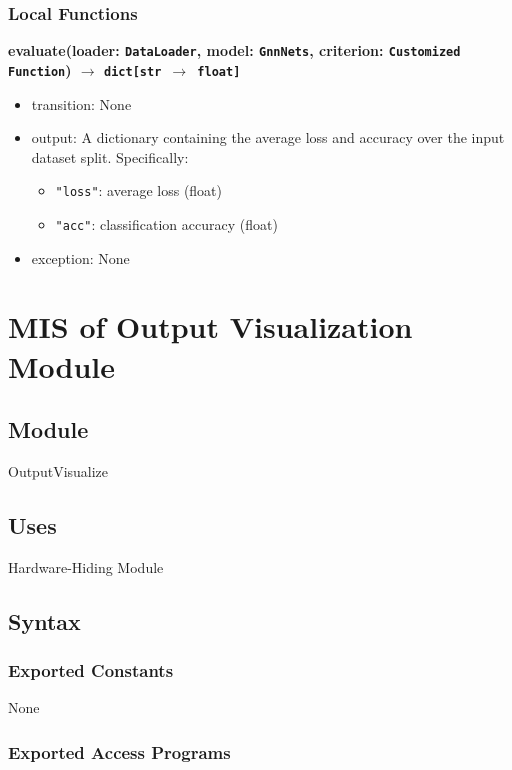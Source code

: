 \documentclass[12pt, titlepage]{article}
\begin{document}
\subsubsection{Local Functions}

\noindent
\textbf{evaluate(loader: \texttt{DataLoader}, model: \texttt{GnnNets}, criterion: \texttt{Customized Function}) \(\rightarrow\) \texttt{dict[str \(\rightarrow\) float]}}
\begin{itemize}
  \item transition: None
  \item output: A dictionary containing the average loss and accuracy over the input dataset split. Specifically:
    \begin{itemize}
      \item \texttt{"loss"}: average loss (float)
      \item \texttt{"acc"}: classification accuracy (float)
    \end{itemize}
  \item exception: None
\end{itemize}






\section{MIS of Output Visualization Module} \label{OutputVisualization}

\subsection{Module}
OutputVisualize

\subsection{Uses}
Hardware-Hiding Module

\subsection{Syntax}

\subsubsection{Exported Constants}
None

\subsubsection{Exported Access Programs}
\end{document}
